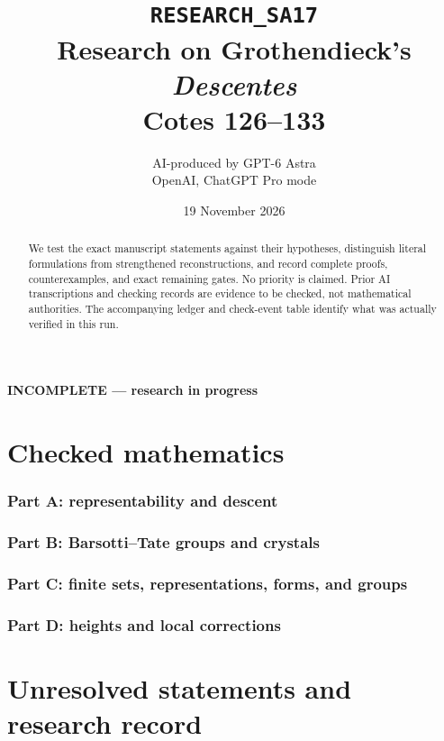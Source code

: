 \documentclass[11pt,a4paper]{article}
\title{\texttt{RESEARCH\_SA17}\\Research on Grothendieck's \emph{Descentes}\\Cotes 126--133}
\author{AI-produced by GPT-6 Astra\\OpenAI, ChatGPT Pro mode}
\date{19 November 2026}
\numberwithin{equation}{section}
\theoremstyle{definition}
\theoremstyle{remark}
\begin{document}
\maketitle
\begin{center}\textbf{INCOMPLETE --- research in progress}\end{center}
\begin{abstract}
We test the exact manuscript statements against their hypotheses, distinguish
literal formulations from strengthened reconstructions, and record complete
proofs, counterexamples, and exact remaining gates. No priority is claimed.
Prior AI transcriptions and checking records are evidence to be checked, not
mathematical authorities. The accompanying ledger and check-event table identify
what was actually verified in this run.
\end{abstract}
\tableofcontents
\clearpage
\part{Checked mathematics}
\section{Part A: representability and descent}
\section{Part B: Barsotti--Tate groups and crystals}
\section{Part C: finite sets, representations, forms, and groups}
\section{Part D: heights and local corrections}
\clearpage
\part{Unresolved statements and research record}


\end{document}
